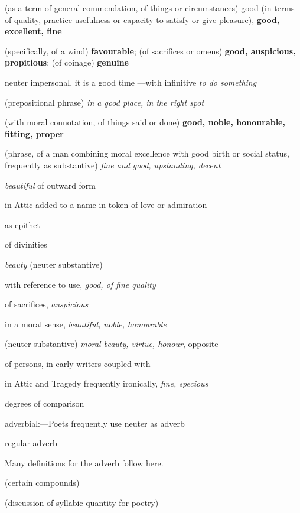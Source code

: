 \begin{compactdesc}
\begin{compactitem}
							\item[5] (as a term of general commendation, of things or circumstances) good (in terms of quality, practice usefulness or capacity to satisfy or give pleasure), \textbf{good, excellent, fine}
							\item[6] (specifically, of a wind) \textbf{favourable}; (of sacrifices or omens) \textbf{good, auspicious, propitious}; (of coinage) \textbf{genuine}
							\item[7] neuter impersonal, it is a good time ---with infinitive \textit{to do something}
							\item[8] (prepositional phrase) \textit{in a good place, in the right spot}
							\item[9] (with moral connotation, of things said or done) \textbf{good, noble, honourable, fitting, proper}
							\item[10] (phrase, of a man combining moral excellence with good birth or social status, frequently as substantive) \textit{fine and good, upstanding, decent}
						\end{compactitem}
					\item[LSJ 870a, PDF 941] \textbf{}
						\begin{compactitem}
							\item[A.I.1] \textit{beautiful} of outward form
							\item[A.I.2.a] in Attic added to a name in token of love or admiration
							\item[A.I.2.b] as epithet
							\item[A.I.2.c] of divinities
							\item[A.I.3] \textit{beauty} (neuter substantive)
							\item[A.II.1] with reference to use, \textit{good, of fine quality}
							\item[A.II.2] of sacrifices, \textit{auspicious}
							\item[A.III.1] in a moral sense, \textit{beautiful, noble, honourable}
							\item[A.III.2] (neuter substantive) \textit{moral beauty, virtue, honour}, opposite 
							\item[A.III.3] of persons, in early writers coupled with 
							\item[A.IV] in Attic and Tragedy frequently ironically, \textit{fine, specious}
							\item[B] degrees of comparison
							\item[C.I] adverbial:---Poets frequently use neuter  as adverb
							\item[C.II] regular adverb 
								\begin{compactitem}
									\item Many definitions for the adverb  follow here.
								\end{compactitem}
							\item[D] (certain compounds)
							\item[E] (discussion of syllabic quantity for poetry)
						\end{compactitem}
				\end{compactdesc}
				
